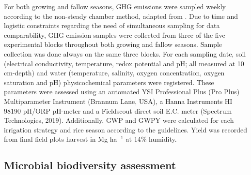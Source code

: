 For both growing and fallow seasons, GHG emissions were sampled weekly according to the non-steady chamber method, adapted from \cite{martinez2018neglecting}. Due to time and logistic constraints regarding the need of simultaneous sampling for data comparability, GHG emission samples were collected from three of the five experimental blocks throughout both growing and fallow seasons. Sample collection was done always on the same three blocks. 
For each sampling date, soil (electrical conductivity, temperature, redox potential and pH; all measured at 10 cm-depth) and water (temperature, salinity, oxygen concentration, oxygen saturation and pH) physicochemical parameters were registered. These parameters were assessed using an automated YSI Professional Plus (Pro Plus) Multiparameter Instrument (Brannum Lane, USA), a Hanna Instruments HI 98190 pH/ORP pH-meter and a Fieldscout direct soil E.C. meter (Spectrum Technologies, 2019). Additionally, GWP and GWPY were calculated for each irrigation strategy and rice season according to the \cite{IPCC2021} guidelines. Yield was recorded from final field plots harvest in Mg ha$^{-1}$ at 14\% humidity.\\

\subsection{Microbial biodiversity assessment}
\label{sec:meth_BIO2}

